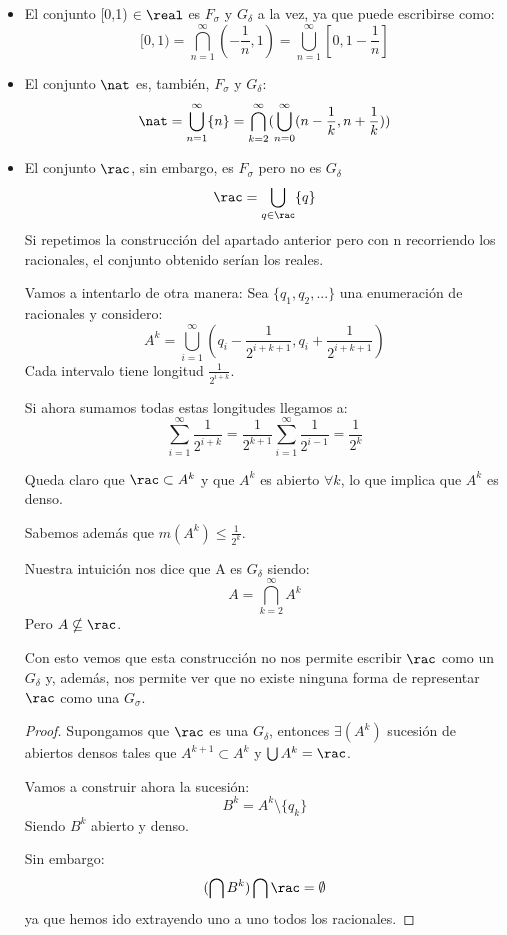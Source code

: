 \documentclass{apuntes}
\begin{document}
\begin{example}
\begin{itemize}
\item El conjunto [0,1) $\in \real$ es $F_\sigma$ y $G_\delta$ a la vez, ya que puede escribirse como:
\[[0,1) = \bigcap_{n=1}^{\infty}(-\frac{1}{n}, 1) = \bigcup_{n=1}^{\infty}[0, 1-\frac{1}{n}]\]

\item El conjunto $\nat$ es, también, $F_\sigma$ y $G_\delta$:
\[\nat = \bigcup_{n=1}^{\infty}\{n\} = \bigcap_{k=2}^{\infty}(\bigcup_{n=0}^{\infty}(n-\frac{1}{k}, n+ \frac{1}{k}))\]

\item El conjunto $\rac$, sin embargo, es $F_\sigma$ pero no es $G_\delta$
\[\rac = \bigcup_{q \in \rac}\{q\} \]
Si repetimos la construcción del apartado anterior pero con n recorriendo los racionales, el conjunto obtenido serían los reales.

Vamos a intentarlo de otra manera:
Sea $\{q_1, q_2, ...\}$ una enumeración de racionales y considero:
\[A^k=\bigcup_{i=1}^{\infty}(q_i-\frac{1}{2^{i+k+1}}, q_i+\frac{1}{2^{i+k+1}})\]
Cada intervalo tiene longitud $\frac{1}{2^{i+k}}$.

Si ahora sumamos todas estas longitudes llegamos a:
\[\sum_{i=1}^{\infty}\frac{1}{2^{i+k}} = \frac{1}{2^{k+1}}\sum_{i=1}^{\infty}\frac{1}{2^{i-1}}=\frac{1}{2^k}\]

Queda claro que $\rac \subset A^k$ y que $A^k$ es abierto $\forall k$, lo que implica que $A^k$ es denso.

Sabemos además que $m(A^k)\leq \frac{1}{2^k}$.

Nuestra intuición nos dice que A es $G_\delta$ siendo:
\[A= \bigcap_{k=2}^{\infty}A^k\]
Pero $A \nsubseteq \rac$.

Con esto vemos que esta construcción no nos permite escribir $\rac$ como un $G_\delta$ y, además, nos permite ver que no existe ninguna forma de representar $\rac$ como una $G_\sigma$.

\begin{proof}
Supongamos que $\rac$ es una $G_\delta$, entonces $\exists(A^k)$ sucesión de abiertos densos tales que $A^{k+1} \subset A^k$ y $\bigcup A^k=\rac$.

Vamos a construir ahora la sucesión:
\[B^k=A^k\setminus \{q_k\}\]
Siendo $B^k$ abierto y denso.

Sin embargo:
\[(\bigcap B^k)\bigcap \rac = \emptyset\]
ya que hemos ido extrayendo uno a uno todos los racionales.


\end{proof}
\end{itemize}
\end{example}
\end{document}
